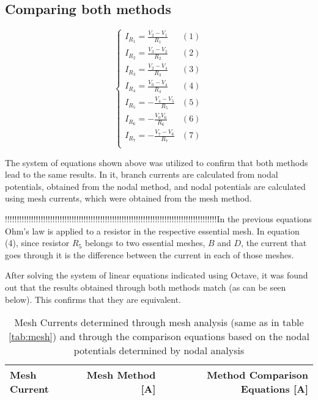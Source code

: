 \subsection{Comparing both methods}
\label{sec:comparison}
\par

\begin{equation}
\begin{cases}
I_{R_1}= \frac{V_2-V_1}{R_1} & \mbox{$(1)$}\\
I_{R_2}= \frac{V_3-V_2}{R_2} & \mbox{$(2)$}\\
I_{R_3}= \frac{V_2-V_4}{R_3} & \mbox{$(3)$}\\
I_{R_4}= \frac{V_0-V_4}{R_4} & \mbox{$(4)$}\\
I_{R_5}= -\frac{V_4-V_5}{R_5} & \mbox{$(5)$}\\
I_{R_6}= -\frac{V_0V_6}{R_6} & \mbox{$(6)$}\\
I_{R_7}= -\frac{V_7-V_6}{R_7} & \mbox{$(7)$}\\
\end{cases}
\end{equation}



The system of equations shown above was utilized to confirm that both methods lead to the same results. In it, branch currents are calculated from nodal potentials, obtained from the nodal method, and nodal potentials are calculated using mesh currents, which were obtained from the mesh method.


\par
!!!!!!!!!!!!!!!!!!!!!!!!!!!!!!!!!!!!!!!!!!!!!!!!!!!!!!!!!!!!!!!!!!!!!!!!!!!!!!!!!!!!!!!!!In the previous equations Ohm's law is applied to a resistor in the respective essential mesh. In equation (4), since resistor $R_5$ belongs to two essential meshes, $B$ and $D$, the current that goes through it is the difference between the current in each of those meshes.

\par
After solving the system of linear equations indicated using Octave, it was found out that the results obtained through both methods match (as can be seen below). This confirms that they are equivalent.

\begin{table}[hbt!]
  \centering
  \begin{tabular}{|l|r|r|}
    \hline    
    {\bf Mesh Current} & {\bf Mesh Method [A]} & {\bf Method Comparison Equations [A]} \\ \hline
    
  \end{tabular}
  \caption{Mesh Currents determined through mesh analysis (same as in table \ref{tab:mesh}) and through the comparison equations based on the nodal potentials determined by nodal analysis}
  \label{tab:comp}
\end{table}
